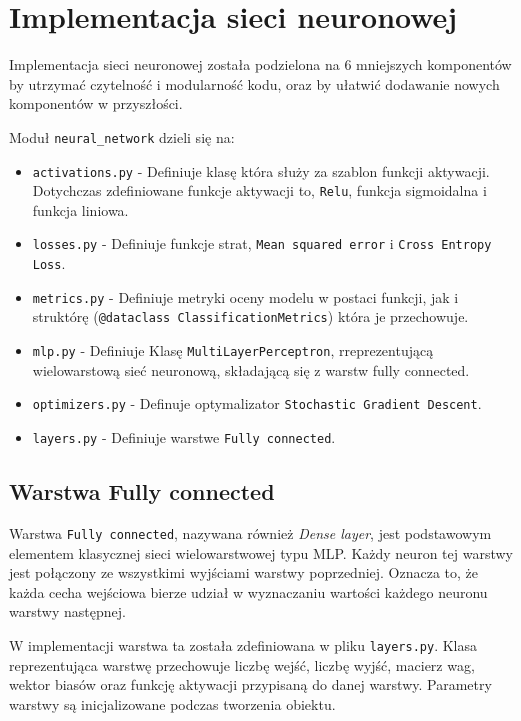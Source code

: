 \section{Implementacja sieci neuronowej}

Implementacja sieci neuronowej została podzielona na 6 mniejszych komponentów by utrzymać czytelność i modularność kodu, oraz by ułatwić dodawanie nowych komponentów w przyszłości.

Moduł \texttt{neural\_network} dzieli się na:
\begin{itemize}
    \item \texttt{activations.py} - Definiuje klasę która służy za szablon funkcji aktywacji. Dotychczas zdefiniowane funkcje aktywacji to, \texttt{Relu}, funkcja sigmoidalna i funkcja liniowa. 
    \item \texttt{losses.py} - Definiuje funkcje strat, \texttt{Mean squared error} i \texttt{Cross Entropy Loss}.
    \item \texttt{metrics.py} - Definiuje metryki oceny modelu w postaci funkcji, jak i struktórę (\texttt{@dataclass ClassificationMetrics}) która je przechowuje. 
    \item \texttt{mlp.py} - Definiuje Klasę \texttt{MultiLayerPerceptron}, rreprezentującą wielowarstową sieć neuronową, składającą się z warstw fully connected.
    \item \texttt{optimizers.py} - Definuje optymalizator \texttt{Stochastic Gradient Descent}. 
    \item \texttt{layers.py} - Definiuje warstwe \texttt{Fully connected}.
\end{itemize}

\subsection{Warstwa Fully connected}

Warstwa \texttt{Fully connected}, nazywana również \textit{Dense layer}, 
jest podstawowym elementem klasycznej sieci wielowarstwowej typu MLP. 
Każdy neuron tej warstwy jest połączony ze wszystkimi wyjściami warstwy poprzedniej.
Oznacza to, że każda cecha wejściowa bierze udział w wyznaczaniu wartości każdego neuronu warstwy następnej.

W implementacji warstwa ta została zdefiniowana w pliku
\texttt{layers.py}. Klasa reprezentująca warstwę przechowuje liczbę wejść,
liczbę wyjść, macierz wag, wektor biasów oraz funkcję aktywacji przypisaną
do danej warstwy. Parametry warstwy są inicjalizowane podczas tworzenia
obiektu.

